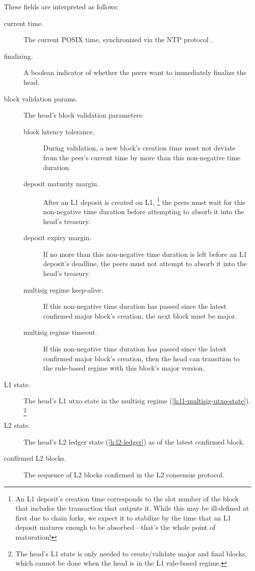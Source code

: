 \documentclass[../hydrozoa.tex]{subfiles}
\begin{document}
These fields are interpreted as follows:
\begin{description}
  \item[current time.] The current POSIX time, synchronized via the NTP protocol \citep{MillsEtAlNetworkTimeProtocol2010}.
  \item[finalizing.] A boolean indicator of whether the peers want to immediately finalize the head.
  \item[block validation params.] The head's block validation parameters:
    \begin{description}
      \item[block latency tolerance.] During validation, a new block's creation time must not deviate from the peer's current time by more than this non-negative time duration.
      \item[deposit maturity margin.] After an L1 deposit is created on L1,%
        \footnote{An L1 deposit's creation time corresponds to the slot number of the block that includes the transaction that outputs it.
          While this may be ill-defined at first due to chain forks, we expect it to stabilize by the time that an L1 deposit matures enough to be absorbed---that's the whole point of maturation!}
        the peers must wait for this non-negative time duration before attempting to absorb it into the head's treasury.
      \item[deposit expiry margin.] If no more than this non-negative time duration is left before an L1 deposit's deadline, the peers must not attempt to absorb it into the head's treasury.
      \item[multisig regime keep-alive.] If this non-negative time duration has passed since the latest confirmed major block's creation, the next block must be major.
      \item[multisig regime timeout.] If this non-negative time duration has passed since the latest confirmed major block's creation, then the head can transition to the rule-based regime with this block's major version.
    \end{description}
  \item[L1 state.] The head's L1 utxo state in the multisig regime (\cref{h:l1-multisig-utxo-state}).%
    \footnote{The head's L1 state is only needed to create/validate major and final blocks, which cannot be done when the head is in the L1 rule-based regime.}
  \item[L2 state.] The head's L2 ledger state (\cref{h:l2-ledger}) as of the latest confirmed block.
  \item[confirmed L2 blocks.] The sequence of L2 blocks confirmed in the L2 consensus protocol.

\end{description}
\end{document}
